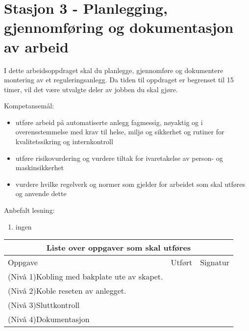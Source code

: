 
\noindent
\section*{Stasjon 3 - Planlegging, gjennomføring  og dokumentasjon  av arbeid}

\vskip 5pt
I dette arbeidsoppdraget skal du planlegge, gjennomføre og dokumentere montering av et reguleringsanlegg. Da tiden til oppdraget er begrenset til 15  timer, vil det være utvalgte deler av jobben du skal gjøre. 

Kompetansemål:
\begin{itemize}[noitemsep]

	\item utføre arbeid på automatiserte anlegg fagmessig, nøyaktig og i overensstemmelse med krav til helse, miljø og sikkerhet og rutiner for kvalitetssikring og internkontroll
	\item utføre risikovurdering og vurdere tiltak for ivaretakelse av person- og maskinsikkerhet
	\item vurdere hvilke regelverk og normer som gjelder for arbeidet som skal utføres og anvende dette
\end{itemize}

Anbefalt lesning:

\begin{enumerate}
	\item ingen       
\end{enumerate}


\begin{center}
\begin{tabular}{ | m{10cm} | m{1cm}| m{2cm} | } 
\hline
\multicolumn{3}{|c|}{Liste over oppgaver som skal utføres} \\
	\hline
	Oppgave	& Utført & Signatur \\ 
	\hline
	\hline
	\cellcolor{green!60}(Nivå 1)Kobling med bakplate ute av skapet.	& & \\ 
	\hline
	\cellcolor{yellow!60}(Nivå 2)Koble reseten av anlegget. 	& & \\ 
	\hline
	\cellcolor{orange!60}(Nivå 3)Sluttkontroll	& & \\ 
	\hline
	\cellcolor{red!60}(Nivå 4)Dokumentasjon	& & \\ 
	\hline
\end{tabular}
\end{center}

